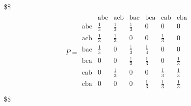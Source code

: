 \documentclass[]{article}
\begin{document}
\$\$ \begin{align}
P = 
\begin{array}{c|c|c|c|c|c|c}
 & \text{abc} & \text{acb} & \text{bac} & \text{bca} & \text{cab}  & \text{cba}  \\ 

\text{abc} & \frac{1}{3} &   \frac{1}{3} &  \frac{1}{3} & 0& 0&0 \\

\text{acb}&  \frac{1}{3} &  \frac{1}{3} & 0 & 0  &  \frac{1}{3} & 0  \\
\text{bac} &  \frac{1}{3} & 0 & \frac{1}{3} & \frac{1}{3} & 0 & 0 \\
\text{bca} & 0 & 0 & \frac{1}{3} &  \frac{1}{3} & 0 &  \frac{1}{3}  \\
\text{cab} & 0 &  \frac{1}{3} & 0 & 0 &  \frac{1}{3}  &  \frac{1}{3} \\
\text{cba}  & 0 & 0 & 0 &  \frac{1}{3} & \frac{1}{3} &  \frac{1}{3} \\ 
\end{array} 
\end{align} \$\$
\end{document}
